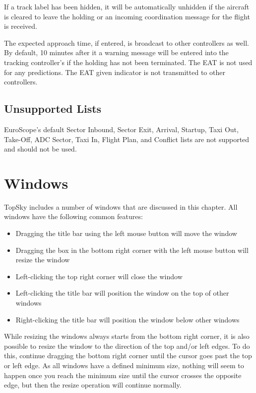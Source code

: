 \documentclass[a4paper,oneside,11pt]{memoir}
\begin{document}
If a track label has been hidden, it will be automatically unhidden if the aircraft is cleared to leave the holding or an incoming coordination message for the flight is received.

\bigskip

The expected approach time, if entered, is broadcast to other controllers as well. By default, 10 minutes after it a warning message will be entered into the tracking controller’s  if the holding has not been terminated. The EAT is not used for any predictions. The EAT given indicator is not transmitted to other controllers.

\subsection{Unsupported Lists}
\label{list:unsup}

EuroScope's default Sector Inbound, Sector Exit, Arrival, Startup, Taxi Out, Take-Off, ADC Sector, Taxi In, Flight Plan, and Conflict lists are not supported and should not be used.

\section{Windows}
TopSky includes a number of windows that are discussed in this chapter. All windows have the following common features:

\bigskip

\begin{itemize}
    \item Dragging the title bar using the left mouse button will move the window
    \item Dragging the box in the bottom right corner with the left mouse button will resize the window
    \item Left-clicking the top right corner will close the window
    \item Left-clicking the title bar will position the window on the top of other windows
    \item Right-clicking the title bar will position the window below other windows
\end{itemize}

\bigskip

While resizing the windows always starts from the bottom right corner, it is also possible to resize the window to the direction of the top and/or left edges. To do this, continue dragging the bottom right corner until the cursor goes past the top or left edge. As all windows have a defined minimum size, nothing will seem to happen once you reach the minimum size until the cursor crosses the opposite edge, but then the resize operation will continue normally.
\end{document}
